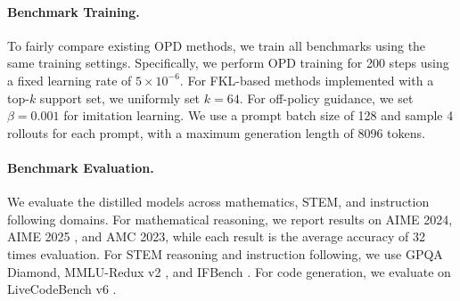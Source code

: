 \documentclass{llmxive}
\providecommand{\cite}[1]{\citep{#1}}
\providecommand{\arraystretch}{1.12}
\begin{document}
\begin{table}[!t]
\centering
\small
\setlength{\tabcolsep}{6pt}
\renewcommand{\arraystretch}{1.1}
\caption{Performance comparison between TrOPD and concurrent AOPD. TrOPD + AOPD indicates TrOPD adding the AOPD objective for the AOPD positive samples.}
\label{tab:aopd_comparison}
\end{table}




\paragraph{Benchmark Training.}
To fairly compare existing OPD methods, we train all benchmarks using the same training settings. Specifically, we perform OPD training for 200 steps using a fixed learning rate of $5 \times 10^{-6}$. For FKL-based methods implemented with a top-$k$ support set, we uniformly set $k=64$. For off-policy guidance, we set $\beta=0.001$ for imitation learning. We use a prompt batch size of 128 and sample 4 rollouts for each prompt, with a maximum generation length of 8096 tokens.


\paragraph{Benchmark Evaluation.}
We evaluate the distilled models across mathematics, STEM, and instruction following domains. For mathematical reasoning, we report results on AIME 2024, AIME 2025 \cite{shi2025aime}, and AMC 2023, while each result is the average accuracy of 32 times evaluation. For STEM reasoning and instruction following, we use GPQA Diamond, MMLU-Redux v2 \cite{gema2025we}, and IFBench \cite{pyatkin2025generalizing}. For code generation, we evaluate on LiveCodeBench v6 \cite{jain2025livecodebench}.
\end{document}
